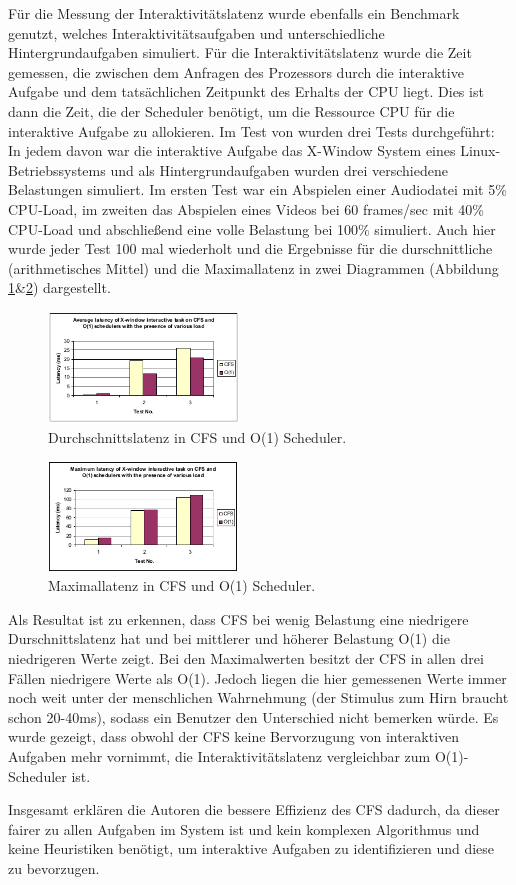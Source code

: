Für die Messung der Interaktivitätslatenz wurde ebenfalls ein Benchmark genutzt, welches Interaktivitätsaufgaben und unterschiedliche Hintergrundaufgaben simuliert. Für die Interaktivitätslatenz wurde die Zeit gemessen, die zwischen dem Anfragen des Prozessors durch die interaktive Aufgabe und dem tatsächlichen Zeitpunkt des Erhalts der CPU liegt. Dies ist dann die Zeit, die der Scheduler benötigt, um die Ressource CPU für die interaktive Aufgabe zu allokieren. Im Test von \cite{papercomparison} wurden drei Tests durchgeführt: In jedem davon war die interaktive Aufgabe das X-Window System eines Linux-Betriebssystems und als Hintergrundaufgaben wurden drei verschiedene Belastungen simuliert. Im ersten Test war ein Abspielen einer Audiodatei mit 5\% CPU-Load, im zweiten das Abspielen eines Videos bei 60 frames/sec mit 40\% CPU-Load und abschließend eine volle Belastung bei 100\% simuliert. Auch hier wurde jeder Test 100 mal wiederholt und die Ergebnisse für die durschnittliche (arithmetisches Mittel) und die Maximallatenz in zwei Diagrammen (Abbildung \ref{fig:avg_latency}\&\ref{fig:max_latency}) dargestellt. 
\begin{figure} [h]
 	\centering
 	\includegraphics[width=0.45\textwidth]{pictures/avg_latency.png}
 	\caption{Durchschnittslatenz in CFS und O(1) Scheduler.}
 	\label{fig:avg_latency}
\end{figure}

\begin{figure} [h]
 	\centering
 	\includegraphics[width=0.45\textwidth]{pictures/max_latency.png}
 	\caption{Maximallatenz in CFS und O(1) Scheduler.}
 	\label{fig:max_latency}
\end{figure}
Als Resultat ist zu erkennen, dass CFS bei wenig Belastung eine niedrigere Durschnittslatenz hat und bei mittlerer und höherer Belastung O(1) die niedrigeren Werte zeigt. Bei den Maximalwerten besitzt der CFS in allen drei Fällen niedrigere Werte als O(1). Jedoch liegen die hier gemessenen Werte immer noch weit unter der menschlichen Wahrnehmung (der Stimulus zum Hirn braucht schon 20-40ms), sodass ein Benutzer den Unterschied nicht bemerken würde. Es wurde gezeigt, dass obwohl der CFS keine Bervorzugung von interaktiven Aufgaben mehr vornimmt, die Interaktivitätslatenz vergleichbar zum O(1)-Scheduler ist. 

Insgesamt erklären die Autoren die bessere Effizienz des CFS dadurch, da dieser fairer zu allen Aufgaben im System ist und kein komplexen Algorithmus und keine Heuristiken benötigt, um interaktive Aufgaben zu identifizieren und diese zu bevorzugen.